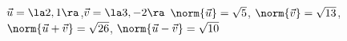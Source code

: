{$\vec u=\la 2,1\ra$,\quad $\vec v = \la 3,-2\ra$
}
{$\norm{\vec u} = \sqrt{5}$, $\norm{\vec v} = \sqrt{13}$, $\norm{\vec u+\vec v} = \sqrt{26}$, $\norm{\vec u-\vec v} = \sqrt{10}$
}
